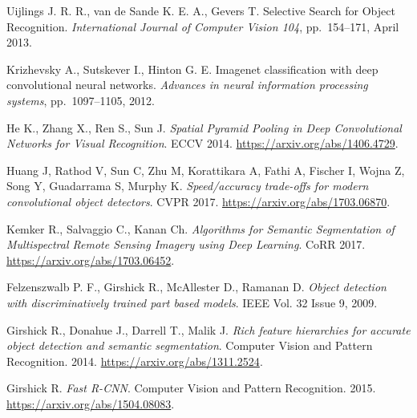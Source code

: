 \documentclass[journal, onecolumn, a4paper]{IEEEtran}
\begin{document}
\newpage
\begin{thebibliography}{5}



	Uijlings J. R. R., van de Sande K. E. A., Gevers T. Selective Search for Object Recognition. {\em International Journal  of Computer Vision 104}, %
	pp.~154--171, April 2013.

	Krizhevsky A., Sutskever I., Hinton G. E. Imagenet classification with deep convolutional neural networks. {\em Advances in neural information processing systems}, %
	pp.~1097--1105, 2012.

	He K., Zhang X., Ren S., Sun J. {\em Spatial Pyramid Pooling in Deep Convolutional Networks for Visual Recognition}. ECCV 2014.
	\url{https://arxiv.org/abs/1406.4729}.

	Huang J, Rathod V, Sun C, Zhu M, Korattikara A, Fathi A, Fischer I, Wojna Z,
Song Y, Guadarrama S, Murphy K. {\em Speed/accuracy trade-offs for modern convolutional object detectors}. CVPR 2017.
	\url{https://arxiv.org/abs/1703.06870}.

	Kemker R., Salvaggio C., Kanan Ch. {\em Algorithms for Semantic Segmentation of Multispectral Remote Sensing Imagery using Deep Learning}. CoRR 2017.
	\url{https://arxiv.org/abs/1703.06452}.

	Felzenszwalb P. F., Girshick R., McAllester D., Ramanan D. {\em Object detection with discriminatively trained part based models}. IEEE Vol. 32 Issue 9, 2009.

	Girshick R., Donahue J., Darrell T., Malik J. {\em Rich feature hierarchies for accurate object detection and semantic segmentation}. Computer Vision and Pattern Recognition. 2014. 
	\url{https://arxiv.org/abs/1311.2524}.

	Girshick R. {\em Fast R-CNN}. Computer Vision and Pattern Recognition. 2015.
	\url{https://arxiv.org/abs/1504.08083}.


\end{thebibliography}
\end{document}
